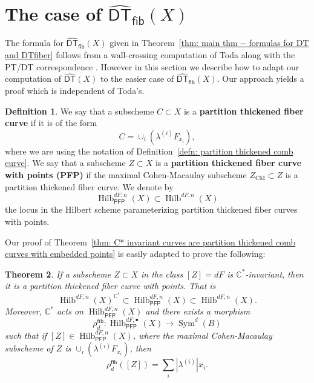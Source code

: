 \documentclass[12pt]{amsart}
\newtheorem{theorem}{Theorem}%
\theoremstyle{definition}
\newtheorem{definition}[theorem]{Definition}
\newcommand{\CC} {\mathbb{C}}          %
\newcommand{\Sym}{\operatorname{Sym}}
\newcommand{\Hilb}{\operatorname{Hilb}}
\newcommand{\DT}{\mathsf{DT}}
\newcommand{\CM}{\operatorname{CM}}
\newcommand{\DThat}{\widehat{\DT}}
\newcommand{\fiber}{\mathsf{fib}}
\newcommand{\PFP}{\mathsf{PFP}}
\begin{document}
\section{The case of $\DThat_{\fiber}(X)$}\label{sec: DThatfiber computation}

The formula for $\DThat_{\fiber}(X)$ given in Theorem~\ref{thm: main
thm -- formulas for DT and DTfiber} follows from a wall-crossing
computation of Toda \cite[Thm~6.9]{Toda-2012-Kyoto} along with the
PT/DT correspondence \cite{Bridgeland-PTDT}. However in this section
we describe how to adapt our computation of $\DThat (X)$ to the easier
case of $\DThat_{\fiber}(X)$. Our approach yields a proof which is
independent of Toda's.


\begin{definition}\label{defn: partition thickened fiber curve}
We say that a subscheme $C\subset X$ is a \textbf{partition thickened
fiber curve} if it is of the form
\[
C= \cup_{i}\left( \lambda^{(i)}F_{x_{i}} \right),
\]
where we are using the notation of Definition~\ref{defn: partition
thickened comb curve}. We say that a subscheme $Z\subset X$ is a
\textbf{partition thickened fiber curve with points (PFP)} if the
maximal Cohen-Macaulay subscheme $Z_{\CM}\subset Z$ is a partition
thickened fiber curve. We denote by
\[
\Hilb^{dF,n}_{\PFP}(X)\subset \Hilb^{dF,n}(X)
\]
the locus in the Hilbert scheme parameterizing partition thickened
fiber curves with points. 
\end{definition}

Our proof of Theorem~\ref{thm: C* invariant curves are partition thickened
comb curves with embedded points} is easily adapted to prove the
following:
\begin{theorem}\label{thm: C* fixed fiber curves are PFP}
If a subscheme $Z\subset X$ in the class $[Z]=dF$ is
$\CC^{*}$-invariant, then it is a partition thickened fiber curve with
points. That is
\[
\Hilb^{dF,n}(X)^{\CC^{*}} \subset \Hilb^{dF,n}_{\PFP}(X) \subset \Hilb^{dF,n}(X).
\]
Moreover, $\CC^{*}$ acts on $\Hilb^{dF,n}_{\PFP}(X)$ and there exists
a morphism
\[
\rho^{\fiber}_{d}:\Hilb^{dF,\bullet}_{\PFP}(X) \to \Sym^{d}(B) 
\]
such that if $[Z]\in \Hilb^{dF,n}_{\PFP}(X)$, where the maximal
Cohen-Macaulay subscheme of $Z$ is
$\cup_{i}\left(\lambda^{(i)}F_{x_{i}} \right)$, then
\[
\rho_{d}^{\fiber}([Z]) = \sum_{i} |\lambda^{(i)}|x_{i}.
\]
\end{theorem}
\end{document}
